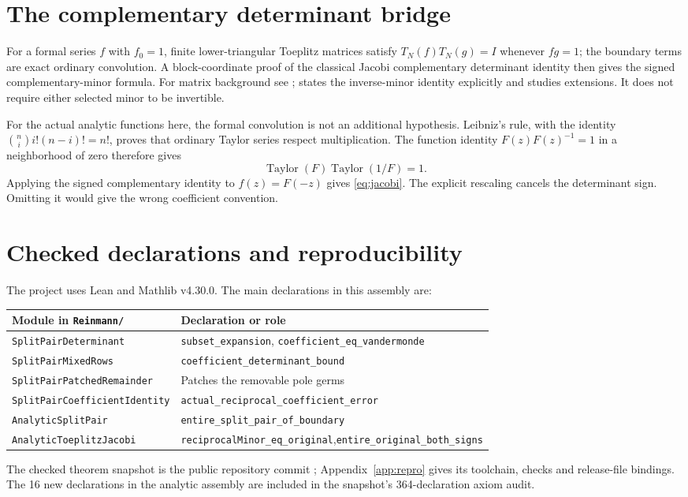 \documentclass[11pt]{amsart}
\begin{document}
\section{The complementary determinant bridge}
For a formal series $f$ with $f_0=1$, finite lower-triangular Toeplitz matrices satisfy
$T_N(f)T_N(g)=I$ whenever $fg=1$; the boundary terms are exact ordinary convolution.
A block-coordinate proof of the classical Jacobi complementary determinant identity then gives the signed complementary-minor formula. For matrix background see \cite{hornjohnson}; \cite{bapat} states the inverse-minor identity explicitly and studies extensions. It does not require either selected minor to be invertible.

For the actual analytic functions here, the formal convolution is not an additional hypothesis. Leibniz's rule, with the identity
$\binom ni i!(n-i)!=n!$, proves that ordinary Taylor series respect multiplication. The function identity $F(z)F(z)^{-1}=1$ in a neighborhood of zero therefore gives
\[
 \operatorname{Taylor}(F)\operatorname{Taylor}(1/F)=1.
\]
Applying the signed complementary identity to $f(z)=F(-z)$ gives \eqref{eq:jacobi}. The explicit rescaling cancels the determinant sign. Omitting it would give the wrong coefficient convention.

\section{Checked declarations and reproducibility}
The project uses Lean and Mathlib v4.30.0. The main declarations in this assembly are:
\begin{center}\footnotesize
\begin{tabular}{p{}p{}}
\toprule
Module in \texttt{Reinmann/} & Declaration or role\\
\midrule
\texttt{SplitPairDeterminant} & \texttt{subset\_expansion}, \texttt{coefficient\_eq\_vandermonde}\\
\texttt{SplitPairMixedRows} & \texttt{coefficient\_determinant\_bound}\\
\texttt{SplitPairPatchedRemainder} & Patches the removable pole germs\\
\texttt{SplitPairCoefficientIdentity} & \texttt{actual\_reciprocal\_coefficient\_error}\\
\texttt{AnalyticSplitPair} & \texttt{entire\_split\_pair\_of\_boundary}\\
\texttt{AnalyticToeplitzJacobi} & \texttt{reciprocalMinor\_eq\_original},\newline \texttt{entire\_original\_both\_signs}\\
\bottomrule
\end{tabular}
\end{center}
\begingroup\raggedright
The checked theorem snapshot is the public repository commit
; Appendix~\ref{app:repro}
gives its toolchain, checks and release-file bindings. The 16 new declarations
in the analytic assembly are included in the snapshot's 364-declaration axiom audit.
\par\endgroup
\end{document}
